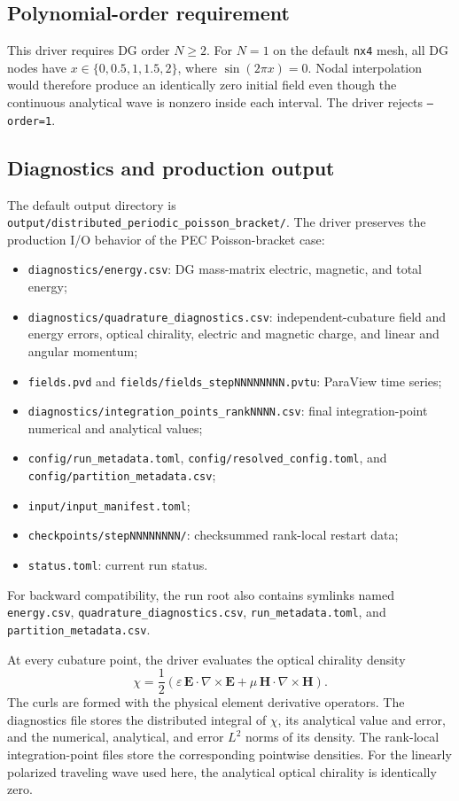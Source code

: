 \documentclass[11pt,oneside]{book}
\newcommand{\code}[1]{\texttt{#1}}
\newcommand{\vect}[1]{\boldsymbol{#1}}
\begin{document}
\subsection{Polynomial-order requirement}

This driver requires DG order $N\geq2$. For $N=1$ on the default
\code{nx4} mesh, all DG nodes have $x\in\{0,0.5,1,1.5,2\}$, where
$\sin(2\pi x)=0$. Nodal interpolation would therefore produce an identically
zero initial field even though the continuous analytical wave is nonzero
inside each interval. The driver rejects \code{--order=1}.

\subsection{Diagnostics and production output}

The default output directory is
\code{output/distributed\_periodic\_poisson\_bracket/}. The driver preserves
the production I/O behavior of the PEC Poisson-bracket case:
\begin{itemize}[leftmargin=*]
  \item \code{diagnostics/energy.csv}: DG mass-matrix electric, magnetic, and
        total energy;
  \item \code{diagnostics/quadrature\_diagnostics.csv}:
        independent-cubature field and energy errors, optical chirality,
        electric and magnetic charge, and linear and angular momentum;
  \item \code{fields.pvd} and \code{fields/fields\_stepNNNNNNNN.pvtu}:
        ParaView time series;
  \item \code{diagnostics/integration\_points\_rankNNNN.csv}: final
        integration-point numerical and analytical values;
  \item \code{config/run\_metadata.toml},
        \code{config/resolved\_config.toml}, and
        \code{config/partition\_metadata.csv};
  \item \code{input/input\_manifest.toml};
  \item \code{checkpoints/stepNNNNNNNN/}: checksummed rank-local restart data;
  \item \code{status.toml}: current run status.
\end{itemize}
For backward compatibility, the run root also contains symlinks named
\code{energy.csv}, \code{quadrature\_diagnostics.csv},
\code{run\_metadata.toml}, and \code{partition\_metadata.csv}.

At every cubature point, the driver evaluates the optical chirality density
\[
  \chi =
  \frac{1}{2}\left(
    \varepsilon\,\vect E\cdot\nabla\times\vect E
    +\mu\,\vect H\cdot\nabla\times\vect H
  \right).
\]
The curls are formed with the physical element derivative operators. The
diagnostics file stores the distributed integral of $\chi$, its analytical
value and error, and the numerical, analytical, and error $L^2$ norms of its
density. The rank-local integration-point files store the corresponding
pointwise densities. For the linearly polarized traveling wave used here,
the analytical optical chirality is identically zero.
\end{document}
